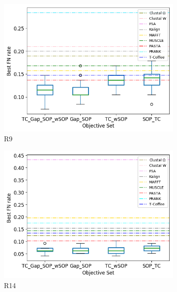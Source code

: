\begin{figure}[!htbp]
\begin{adjustwidth}{-1cm}{-1cm}
\begin{subfigure}{0.22\textwidth}
		\includegraphics[width=\columnwidth]{Figure/summary/precomputedInit/R9/objset_fnrate_rank}
		\caption{R9}
	\end{subfigure}
	\begin{subfigure}{0.22\textwidth}
		\includegraphics[width=\columnwidth]{Figure/summary/precomputedInit/R14/objset_fnrate_rank}
		\caption{R14}
	\end{subfigure}
	\begin{subfigure}{0.22\textwidth}

\end{subfigure}
\end{adjustwidth}
\end{figure}
